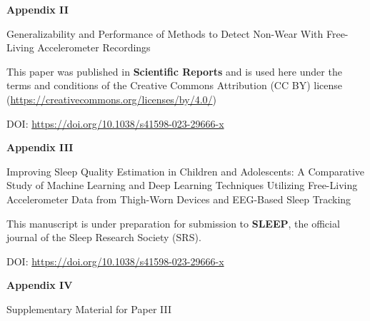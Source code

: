\documentclass[
  9pt,
]{scrbook}
\begin{document}
\begin{center}

\textbf{\textsf{\Huge Appendix II}}



\vspace{1cm}

\textsf{\Huge Generalizability and Performance of Methods to Detect Non-Wear With Free-Living Accelerometer Recordings}

\vspace{5cm}

This paper was published in \textbf{Scientific Reports} and is used here under the terms and conditions of the Creative Commons Attribution (CC BY) license (\href{https://creativecommons.org/licenses/by/4.0/}{https://creativecommons.org/licenses/by/4.0/})

\vspace{1cm}

DOI: \href{https://doi.org/10.1038/s41598-023-29666-x}{https://doi.org/10.1038/s41598-023-29666-x}

\end{center}



\begin{center}

\textbf{\textsf{\Huge Appendix III}}



\vspace{1cm}

\textsf{\Huge Improving Sleep Quality Estimation in Children and Adolescents: A Comparative Study of Machine Learning and Deep Learning Techniques Utilizing Free-Living Accelerometer Data from Thigh-Worn Devices and EEG-Based Sleep Tracking}

\vspace{5cm}

This manuscript is under preparation for submission to \textbf{SLEEP}, the official journal of the Sleep Research Society (SRS).

\vspace{1cm}

DOI: \href{https://doi.org/10.1038/s41598-023-29666-x}{https://doi.org/10.1038/s41598-023-29666-x}

\end{center}



\begin{center}

\textbf{\textsf{\Huge Appendix IV}}



\vspace{1cm}

\textsf{\Huge Supplementary Material for Paper III}

\end{center}




\backmatter
\end{document}
